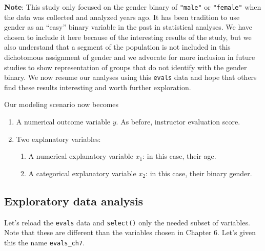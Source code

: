 \documentclass[12pt,]{krantz}
\makeatletter
\newenvironment{Shaded}{\begin{snugshade}}{\end{snugshade}}
\newcommand{\KeywordTok}[1]{\textcolor[rgb]{0.27,0.27,0.27}{\textbf{#1}}}
\newcommand{\StringTok}[1]{\textcolor[rgb]{0.5,0.5,0.5}{#1}}
\newcommand{\OperatorTok}[1]{\textcolor[rgb]{0.43,0.43,0.43}{\textbf{#1}}}
\newcommand{\NormalTok}[1]{#1}
\providecommand{\tightlist}{%
  \setlength{\itemsep}{0pt}\setlength{\parskip}{0pt}}
\newenvironment{kframe}{%
\medskip{}
\setlength{\fboxsep}{.8em}
 \def\at@end@of@kframe{}%
 \ifinner\ifhmode%
  \def\at@end@of@kframe{\end{minipage}}%
  \begin{minipage}{\columnwidth}%
 \fi\fi%
 \def\FrameCommand##1{\hskip\@totalleftmargin \hskip-\fboxsep
 \colorbox{shadecolor}{##1}\hskip-\fboxsep
     \hskip-\linewidth \hskip-\@totalleftmargin \hskip\columnwidth}%
 \MakeFramed {\advance\hsize-\width
   \@totalleftmargin\z@ \linewidth\hsize
   \@setminipage}}%
 {\par\unskip\endMakeFramed%
 \at@end@of@kframe}
\renewenvironment{Shaded}{\begin{kframe}}{\end{kframe}}
\makeatother
\begin{document}
\textbf{Note}: This study only focused on the gender binary of
\texttt{"male"} or \texttt{"female"} when the data was collected and
analyzed years ago. It has been tradition to use gender as an ``easy''
binary variable in the past in statistical analyses. We have chosen to
include it here because of the interesting results of the study, but we
also understand that a segment of the population is not included in this
dichotomous assignment of gender and we advocate for more inclusion in
future studies to show representation of groups that do not identify
with the gender binary. We now resume our analyses using this
\texttt{evals} data and hope that others find these results interesting
and worth further exploration.

Our modeling scenario now becomes

\begin{enumerate}
\def\labelenumi{\arabic{enumi}.}
\tightlist
\item
  A numerical outcome variable \(y\). As before, instructor evaluation
  score.
\item
  Two explanatory variables:

  \begin{enumerate}
  \def\labelenumii{\arabic{enumii}.}
  \tightlist
  \item
    A numerical explanatory variable \(x_1\): in this case, their age.
  \item
    A categorical explanatory variable \(x_2\): in this case, their
    binary gender.
  \end{enumerate}
\end{enumerate}

\subsection{Exploratory data analysis}\label{model4EDA}

Let's reload the \texttt{evals} data and \texttt{select()} only the
needed subset of variables. Note that these are different than the
variables chosen in Chapter 6. Let's given this the name
\texttt{evals\_ch7}.

\begin{Shaded}
\end{Shaded}
\end{document}
